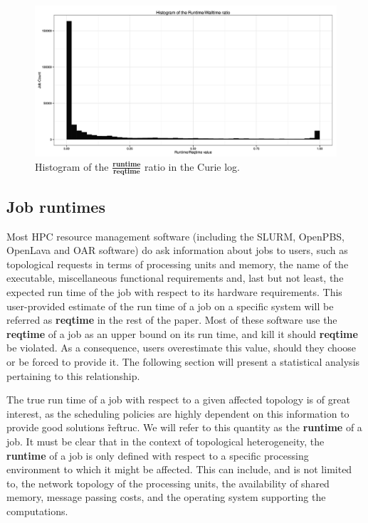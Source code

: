 \documentclass{article}
\begin{document}
\begin{figure}[b]
        \centering
        \includegraphics[width=\textwidth]{../../wallimage-1.png}
        \caption{Histogram of the $\frac{\textbf{runtime}}{\textbf{reqtime}}$ ratio in the Curie log.}
        \label{fig:ratio}
\end{figure}

\subsection{Job runtimes}
Most HPC resource management software (including the SLURM, OpenPBS, OpenLava and OAR software) do ask information about jobs to users, such as topological requests in terms of processing units and memory, the name of the executable, miscellaneous functional requirements and, last but not least, the expected run time of the job with respect to its hardware requirements.
This user-provided estimate of the run time of a job on a specific system will be referred as \textbf{reqtime} in the rest of the paper. Most of these software use the \textbf{reqtime} of a job as an upper bound on its run time, and kill it should \textbf{reqtime} be violated. As a consequence, users overestimate this value, should they choose or be forced to provide it. The following section will present a statistical analysis pertaining to this relationship.

The true run time of a job with respect to a given affected topology is of great interest, as the scheduling policies are highly dependent on this information to provide good solutions \~ref{truc}. We will refer to this quantity as the \textbf{runtime} of a job.
It must be clear that in the context of topological heterogeneity, the \textbf{runtime} of a job is only defined with respect to a specific processing environment to which it might be affected.
This can include, and is not limited to, the network topology of the processing units, the availability of shared memory, message passing costs, and the operating system supporting the computations.
\end{document}
